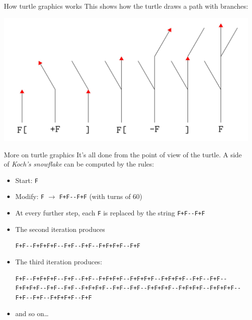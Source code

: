 \documentclass[bigger]{beamer}
\begin{document}
\begin{frame}[label={sec:org3a91756}]{How turtle graphics works}
This shows how the turtle draws a path with branches:

\begin{center}
\includegraphics[width=.9\linewidth]{./growth.jpg}
\end{center}
\end{frame}

\begin{frame}[fragile,label={sec:org75935e7}]{More on turtle graphics}
 It's all done from the point of view of the turtle.  A side of \emph{Koch's
snowflake} can be computed by the rules:

\begin{itemize}
\item Start: \texttt{F}
\item Modify: \texttt{F} \(\rightarrow\) \texttt{F+F-{}-F+F} (with turns of 60\textdegree{})
\item At every further step, each \texttt{F} is replaced by the string \texttt{F+F-{}-F+F}
\item The second iteration produces

\texttt{F+F-{}-F+F+F+F-{}-F+F-{}-F+F-{}-F+F+F+F-{}-F+F}
\item The third iteration produces:

\texttt{F+F-{}-F+F+F+F-{}-F+F-{}-F+F-{}-F+F+F+F-{}-F+F+F+F-{}-F+F+F+F-{}-F+F-{}-F+F-{}-F+F+F+F-{}-F+F-{}-F+F-{}-F+F+F+F-{}-F+F-{}-F+F-{}-F+F+F+F-{}-F+F+F+F-{}-F+F+F+F-{}-F+F-{}-F+F-{}-F+F+F+F-{}-F+F}
\item and so on\ldots{}
\end{itemize}
\end{frame}
\end{document}
